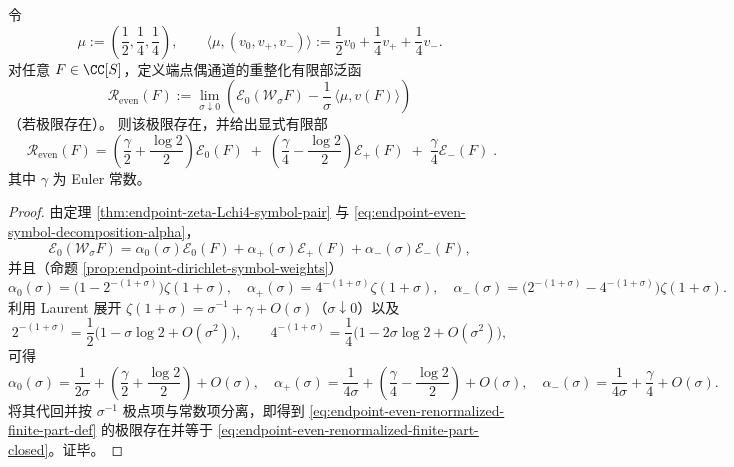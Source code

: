 \begin{theorem}\label{thm:endpoint-even-finite-part-renormalization}
令
\[
\mu:=\left(\frac12,\frac14,\frac14\right),\qquad
\langle \mu,(v_0,v_+,v_-)\rangle:=\frac12 v_0+\frac14 v_++\frac14 v_-.
\]
对任意 \(F\in\CC[S]\)，定义端点偶通道的重整化有限部泛函
\begin{equation}\label{eq:endpoint-even-renormalized-finite-part-def}
\boxed{\;
\mathcal R_{\mathrm{even}}(F)
:=\lim_{\sigma\downarrow 0}\left(
\mathcal E_{0}(\mathcal W_\sigma F)
-\frac{1}{\sigma}\,\langle \mu,v(F)\rangle
\right)\;}
\end{equation}
（若极限存在）。
则该极限存在，并给出显式有限部
\begin{equation}\label{eq:endpoint-even-renormalized-finite-part-closed}
\boxed{\;
\mathcal R_{\mathrm{even}}(F)
=\left(\frac{\gamma}{2}+\frac{\log 2}{2}\right)\mathcal E_{0}(F)
\;+\;\left(\frac{\gamma}{4}-\frac{\log 2}{2}\right)\mathcal E_{+}(F)
\;+\;\frac{\gamma}{4}\mathcal E_{-}(F)\; }.
\end{equation}
其中 \(\gamma\) 为 Euler 常数。
\end{theorem}

\begin{proof}
由定理 \ref{thm:endpoint-zeta-Lchi4-symbol-pair} 与 \eqref{eq:endpoint-even-symbol-decomposition-alpha}，
\[
\mathcal E_0(\mathcal W_\sigma F)
=\alpha_0(\sigma)\mathcal E_0(F)+\alpha_+(\sigma)\mathcal E_+(F)+\alpha_-(\sigma)\mathcal E_-(F),
\]
并且（命题 \ref{prop:endpoint-dirichlet-symbol-weights}）
\[
\alpha_0(\sigma)=\bigl(1-2^{-(1+\sigma)}\bigr)\zeta(1+\sigma),\quad
\alpha_+(\sigma)=4^{-(1+\sigma)}\zeta(1+\sigma),\quad
\alpha_-(\sigma)=\bigl(2^{-(1+\sigma)}-4^{-(1+\sigma)}\bigr)\zeta(1+\sigma).
\]
利用 Laurent 展开 \(\zeta(1+\sigma)=\sigma^{-1}+\gamma+O(\sigma)\)（\(\sigma\downarrow 0\)）以及
\[
2^{-(1+\sigma)}=\frac12\bigl(1-\sigma\log 2+O(\sigma^2)\bigr),\qquad
4^{-(1+\sigma)}=\frac14\bigl(1-2\sigma\log 2+O(\sigma^2)\bigr),
\]
可得
\[
\alpha_0(\sigma)=\frac{1}{2\sigma}+\left(\frac{\gamma}{2}+\frac{\log 2}{2}\right)+O(\sigma),\quad
\alpha_+(\sigma)=\frac{1}{4\sigma}+\left(\frac{\gamma}{4}-\frac{\log 2}{2}\right)+O(\sigma),\quad
\alpha_-(\sigma)=\frac{1}{4\sigma}+\frac{\gamma}{4}+O(\sigma).
\]
将其代回并按 \(\sigma^{-1}\) 极点项与常数项分离，即得到 \eqref{eq:endpoint-even-renormalized-finite-part-def} 的极限存在并等于 \eqref{eq:endpoint-even-renormalized-finite-part-closed}。证毕。
\end{proof}

